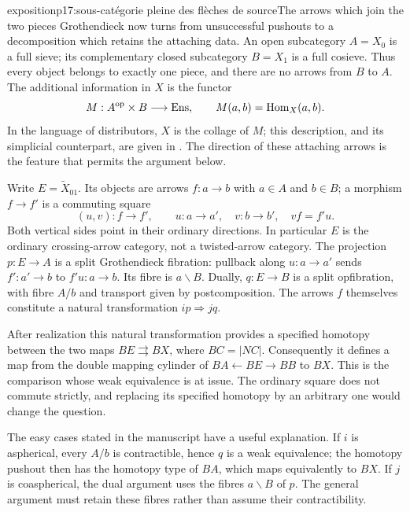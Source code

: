 \begin{dcomment}{exposition}{p17:sous-catégorie pleine des flèches de source}{The arrows which join the two pieces}
Grothendieck now turns from unsuccessful pushouts to a decomposition which retains the attaching data. An open subcategory $A=X_0$ is a full sieve; its complementary closed subcategory $B=X_1$ is a full cosieve. Thus every object belongs to exactly one piece, and there are no arrows from $B$ to $A$. The additional information in $X$ is the functor
\[
 M:A^{\mathrm{op}}\times B\longrightarrow\mathrm{Ens},
 \qquad M(a,b)=\mathrm{Hom}_X(a,b).
\]
In the language of distributors, $X$ is the collage of $M$; this description, and its simplicial counterpart, are given in \citet[\S\S7.1--7.2, pp.~309--311]{Joyal2008Quasi}. The direction of these attaching arrows is the feature that permits the argument below.

Write $E=\widetilde X_{01}$. Its objects are arrows $f:a\to b$ with $a\in A$ and $b\in B$; a morphism $f\to f'$ is a commuting square
\[
 (u,v):f\longrightarrow f',\qquad
 u:a\to a',\quad v:b\to b',\quad vf=f'u.
\]
Both vertical sides point in their ordinary directions. In particular $E$ is the ordinary crossing-arrow category, not a twisted-arrow category. The projection $p:E\to A$ is a split Grothendieck fibration: pullback along $u:a\to a'$ sends $f':a'\to b$ to $f'u:a\to b$. Its fibre is $a\backslash B$. Dually, $q:E\to B$ is a split opfibration, with fibre $A/b$ and transport given by postcomposition. The arrows $f$ themselves constitute a natural transformation $ip\Rightarrow jq$.

After realization this natural transformation provides a specified homotopy between the two maps $BE\rightrightarrows BX$, where $BC=|NC|$. Consequently it defines a map from the double mapping cylinder of $BA\leftarrow BE\to BB$ to $BX$. This is the comparison whose weak equivalence is at issue. The ordinary square does not commute strictly, and replacing its specified homotopy by an arbitrary one would change the question.

The easy cases stated in the manuscript have a useful explanation. If $i$ is aspherical, every $A/b$ is contractible, hence $q$ is a weak equivalence; the homotopy pushout then has the homotopy type of $BA$, which maps equivalently to $BX$. If $j$ is coaspherical, the dual argument uses the fibres $a\backslash B$ of $p$. The general argument must retain these fibres rather than assume their contractibility.
\end{dcomment}


